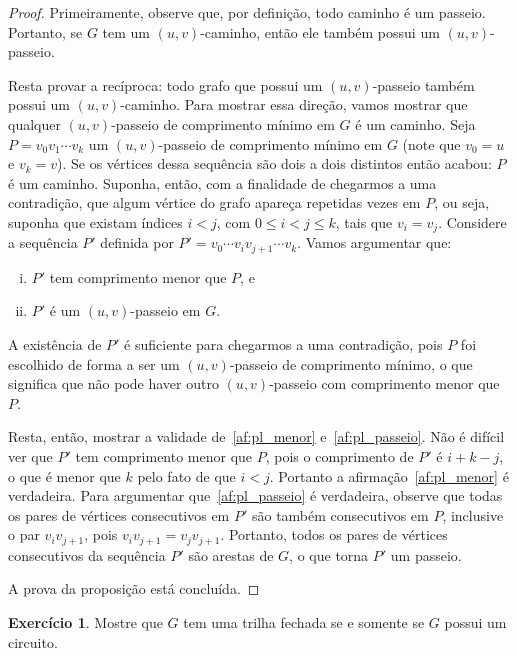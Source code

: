 \documentclass[12pt, a4paper]{article}
\theoremstyle{definition}
\newtheorem{exer}{Exercício}
\begin{document}
\begin{proof}
Primeiramente, observe que, por definição, todo caminho é um passeio. Portanto, se $G$ tem um $(u,v)$-caminho, então ele também possui um $(u,v)$-passeio.

Resta provar a recíproca: todo grafo que possui um $(u,v)$-passeio também possui um $(u,v)$-caminho. Para mostrar essa direção, vamos mostrar que qualquer $(u,v)$-passeio de comprimento mínimo em $G$ é um caminho. Seja $P = v_0v_1 \cdots v_k$ um $(u,v)$-passeio de comprimento mínimo em $G$ (note que $v_0 = u$ e $v_k = v$). Se os vértices dessa sequência são dois a dois distintos então acabou: $P$ é um caminho. Suponha, então, com a finalidade de chegarmos a uma contradição, que algum vértice do grafo apareça repetidas vezes em $P$, ou seja, suponha que existam índices $i < j$, com $0 \leq i < j \leq k$, tais que $v_i = v_j$. 
Considere a sequência $P'$ definida por $P' = v_0 \cdots v_i v_{j+1} \cdots v_k$. Vamos argumentar que:
\begin{enumerate}[(i)]
    \item \label{af:pl_menor} $P'$ tem comprimento menor que $P$, e
    \item \label{af:pl_passeio} $P'$ é um $(u,v)$-passeio em $G$.
\end{enumerate}
A existência de $P'$ é suficiente para chegarmos a uma contradição, pois $P$ foi escolhido de forma a ser um $(u,v)$-passeio de comprimento mínimo, o que significa que não pode haver outro $(u,v)$-passeio com comprimento menor que~$P$.

Resta, então, mostrar a validade de~\eqref{af:pl_menor} e~\eqref{af:pl_passeio}. Não é difícil ver que $P'$ tem comprimento menor que $P$, pois o comprimento de $P'$ é $i + k - j$, o que é menor que $k$ pelo fato de que $i < j$. Portanto a afirmação~\eqref{af:pl_menor} é verdadeira. Para argumentar que~\eqref{af:pl_passeio} é verdadeira, observe que todas os pares de vértices consecutivos em $P'$ são também consecutivos em $P$, inclusive o par $v_i v_{j+1}$, pois $v_i v_{j+1} = v_j v_{j+1}$. Portanto, todos os pares de vértices consecutivos da sequência $P'$ são arestas de $G$, o que torna $P'$ um passeio.

A prova da proposição está concluída.
\end{proof}

\begin{exer}
Mostre que $G$ tem uma trilha fechada se e somente se $G$ possui um circuito.
\end{exer}
\end{document}
